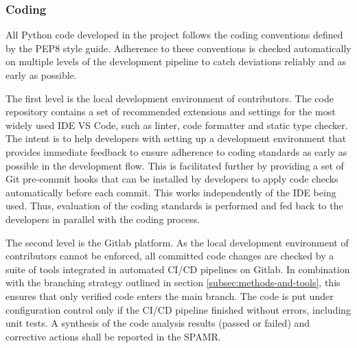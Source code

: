 \subsubsection{Coding}
\label{subsec:coding}

%
%
%
%
%
%

All Python code developed in the project follows the coding conventions defined by the PEP8 style guide. Adherence to these conventions is checked automatically on multiple levels of the development pipeline to catch deviations reliably and as early as possible.

The first level is the local development environment of contributors. The code repository contains a set of recommended extensions and settings for the most widely used IDE VS Code, such as linter, code formatter and static type checker. The intent is to help developers with setting up a development environment that provides immediate feedback to ensure adherence to coding standards as early as possible in the development flow. This is facilitated further by providing a set of Git pre-commit hooks that can be installed by developers to apply code checks automatically before each commit. This works independently of the IDE being used. Thus, evaluation of the coding standards is performed and fed back to the developers in parallel with the coding process.

The second level is the Gitlab platform. As the local development environment of contributors cannot be enforced, all committed code changes are checked by a suite of tools integrated in automated CI/CD pipelines on Gitlab. In combination with the branching strategy outlined in section \ref{subsec:methods-and-tools}, this ensures that only verified code enters the main branch. The code is put under configuration control only if the CI/CD pipeline finished without errors, including unit tests. A synthesis of the code analysis results (passed or failed) and corrective actions shall be reported in the SPAMR.

